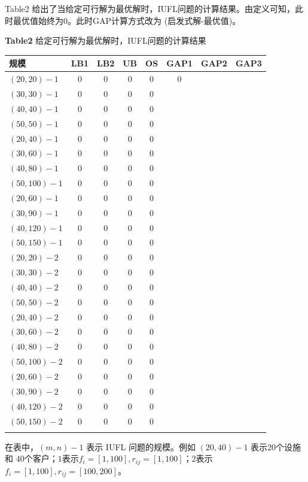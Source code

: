 \documentclass[UTF8]{article}
\begin{document}
Table2 给出了当给定可行解为最优解时，IUFL问题的计算结果。由定义可知，此时最优值始终为0。此时GAP计算方式改为 (启发式解-最优值)。
 {\small\begin{table}[h!]
 \centerline{\small{\heiti\bf Table2}  给定可行解为最优解时，IUFL问题的计算结果}
 \vskip 2mm
 \centering
 \begin{tabular}{lccccccc}
     \shline
 规模&LB1 &LB2&UB  &OS & GAP1 & GAP2 & GAP3\\
     \hline
 $(20,20)-1$ & 0 & 0 & 0  & 0 & 0\\
 $(30,30)-1$ & 0 & 0   & 0  & 0 \\
 $(40,40)-1$ & 0 & 0 & 0  & 0 \\
 $(50,50)-1$ & 0 & 0   & 0  & 0 \\
 $(20,40)-1$ & 0 & 0   & 0  & 0 \\
 $(30,60)-1$ & 0 & 0   & 0  & 0 \\
 $(40,80)-1$ & 0 & 0   & 0  & 0 \\
 $(50,100)-1$ & 0 & 0   & 0  & 0 \\
 $(20,60)-1$ & 0 & 0   & 0  & 0 \\
 $(30,90)-1$ & 0 & 0   & 0  & 0 \\
 $(40,120)-1$ & 0 & 0   & 0  & 0 \\
 $(50,150)-1$ & 0 & 0   & 0  & 0 \\
 $(20,20)-2$ & 0 & 0 & 0  & 0 \\
 $(30,30)-2$ & 0 & 0   & 0  & 0 \\
 $(40,40)-2$ & 0 & 0 & 0  & 0 \\
 $(50,50)-2$ & 0 & 0   & 0  & 0 \\
 $(20,40)-2$ & 0 & 0   & 0  & 0 \\
 $(30,60)-2$ & 0 & 0   & 0  & 0 \\
 $(40,80)-2$ & 0 & 0   & 0  & 0 \\
 $(50,100)-2$ & 0 & 0   & 0  & 0 \\
 $(20,60)-2$ & 0 & 0   & 0  & 0 \\
 $(30,90)-2$ & 0 & 0   & 0  & 0 \\
 $(40,120)-2$ & 0 & 0   & 0  & 0 \\
 $(50,150)-2$ & 0 & 0   & 0  & 0 \\
    \shline
  \end{tabular}
  \end{table}}

在表中，$(m,n)-1$ 表示 IUFL 问题的规模。例如 $(20,40)-1$ 表示20个设施和 40个客户；$1 $表示$f_i=[1,100],r_{ij}= [1,100]$；$2 $表示$f_i=[1,100],r_{ij}= [100,200]$。
\end{document}
